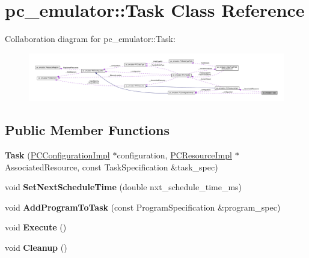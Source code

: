 \hypertarget{classpc__emulator_1_1Task}{}\section{pc\+\_\+emulator\+:\+:Task Class Reference}
\label{classpc__emulator_1_1Task}


Collaboration diagram for pc\+\_\+emulator\+:\+:Task\+:
\nopagebreak
\begin{figure}[H]
\begin{center}
\leavevmode
\includegraphics[width=350pt]{classpc__emulator_1_1Task__coll__graph}
\end{center}
\end{figure}
\subsection*{Public Member Functions}
\begin{DoxyCompactItemize}
\item 
{\bfseries Task} (\hyperlink{classpc__emulator_1_1PCConfigurationImpl}{P\+C\+Configuration\+Impl} $\ast$configuration, \hyperlink{classpc__emulator_1_1PCResourceImpl}{P\+C\+Resource\+Impl} $\ast$Associated\+Resource, const Task\+Specification \&task\+\_\+spec)\hypertarget{classpc__emulator_1_1Task_a74acde57ab68736994269fbc1f766b40}{}\label{classpc__emulator_1_1Task_a74acde57ab68736994269fbc1f766b40}

\item 
void {\bfseries Set\+Next\+Schedule\+Time} (double nxt\+\_\+schedule\+\_\+time\+\_\+ms)\hypertarget{classpc__emulator_1_1Task_aff1a23718b08cc7a28ab15e1de90221f}{}\label{classpc__emulator_1_1Task_aff1a23718b08cc7a28ab15e1de90221f}

\item 
void {\bfseries Add\+Program\+To\+Task} (const Program\+Specification \&program\+\_\+spec)\hypertarget{classpc__emulator_1_1Task_a733bec232faef021949c6905470f512f}{}\label{classpc__emulator_1_1Task_a733bec232faef021949c6905470f512f}

\item 
void {\bfseries Execute} ()\hypertarget{classpc__emulator_1_1Task_a95ceb2ef449c3ab5539c3353340d1847}{}\label{classpc__emulator_1_1Task_a95ceb2ef449c3ab5539c3353340d1847}

\item 
void {\bfseries Cleanup} ()\hypertarget{classpc__emulator_1_1Task_a384d41dbdfed5df46c895978f4af04cd}{}\label{classpc__emulator_1_1Task_a384d41dbdfed5df46c895978f4af04cd}

\end{DoxyCompactItemize}
